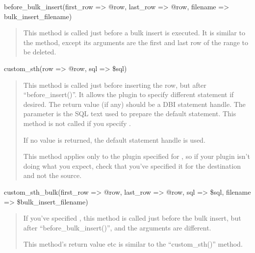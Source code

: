 \documentclass[letterpaper,10pt,english]{sphinxmanual}
\begin{document}
before\_bulk\_insert(first\_row =\textgreater{} @row, last\_row =\textgreater{} @row, filename =\textgreater{} bulk\_insert\_filename)
\begin{quote}

This method is called just before a bulk insert is executed.  It is similar to
the  method, except its arguments are the first and last row of
the range to be deleted.
\end{quote}

custom\_sth(row =\textgreater{} @row, sql =\textgreater{} \$sql)
\begin{quote}

This method is called just before inserting the row, but after
“before\_insert()”.  It allows the plugin to specify different 
statement if desired.  The return value (if any) should be a DBI statement
handle.  The  parameter is the SQL text used to prepare the default
 statement.  This method is not called if you specify
{\hyperref[\detokenize{mariadb-archiver:cmdoption-mariadb-archiver-bulk-insert}]{}}.

If no value is returned, the default  statement handle is used.

This method applies only to the plugin specified for {\hyperref[\detokenize{mariadb-archiver:cmdoption-mariadb-archiver-dest}]{}}, so if your
plugin isn’t doing what you expect, check that you’ve specified it for the
destination and not the source.
\end{quote}

custom\_sth\_bulk(first\_row =\textgreater{} @row, last\_row =\textgreater{} @row, sql =\textgreater{} \$sql, filename =\textgreater{} \$bulk\_insert\_filename)
\begin{quote}

If you’ve specified {\hyperref[\detokenize{mariadb-archiver:cmdoption-mariadb-archiver-bulk-insert}]{}}, this method is called just before the
bulk insert, but after “before\_bulk\_insert()”, and the arguments are
different.

This method’s return value etc is similar to the “custom\_sth()” method.
\end{quote}
\end{document}
